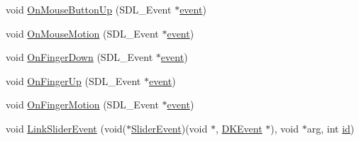 \begin{DoxyCompactItemize}
\item 
void \hyperlink{class_d_k_slider_a78090ff45cccbf069df3ed5512d71633}{On\-Mouse\-Button\-Up} (S\-D\-L\-\_\-\-Event $\ast$\hyperlink{class_d_k_event_a3deebb932ed734363c4ece87971bc45f}{event})
\item 
void \hyperlink{class_d_k_slider_a8b9d46262bb3bf7ae2145a3aa22570d5}{On\-Mouse\-Motion} (S\-D\-L\-\_\-\-Event $\ast$\hyperlink{class_d_k_event_a3deebb932ed734363c4ece87971bc45f}{event})
\item 
void \hyperlink{class_d_k_slider_a2b640444d959b169478bee0e665bbf6b}{On\-Finger\-Down} (S\-D\-L\-\_\-\-Event $\ast$\hyperlink{class_d_k_event_a3deebb932ed734363c4ece87971bc45f}{event})
\item 
void \hyperlink{class_d_k_slider_af917c7cd50737ad105f17f5d2611a826}{On\-Finger\-Up} (S\-D\-L\-\_\-\-Event $\ast$\hyperlink{class_d_k_event_a3deebb932ed734363c4ece87971bc45f}{event})
\item 
void \hyperlink{class_d_k_slider_a30e681e0b9832bf4b27bb9b341183393}{On\-Finger\-Motion} (S\-D\-L\-\_\-\-Event $\ast$\hyperlink{class_d_k_event_a3deebb932ed734363c4ece87971bc45f}{event})
\item 
void \hyperlink{class_d_k_slider_ac7d239047ed7f5adccca0a6992d4f283}{Link\-Slider\-Event} (void($\ast$\hyperlink{class_d_k_event_a9baf4474717a37b04e6f2cec78bfa699}{Slider\-Event})(void $\ast$, \hyperlink{class_d_k_event}{D\-K\-Event} $\ast$), void $\ast$arg, int \hyperlink{class_d_k_event_a46877918e12fcb3b2c8988379b6fa6fa}{id})
\end{DoxyCompactItemize}
